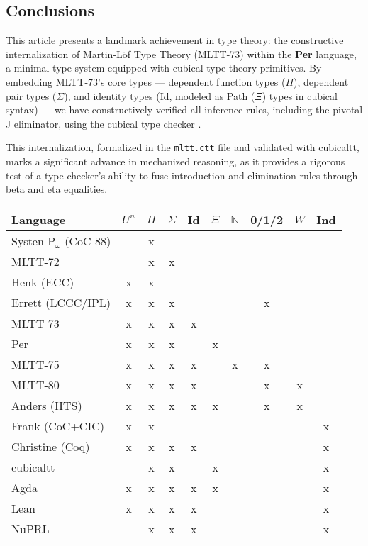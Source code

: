 \documentclass{article}
\begin{document}
\subsection*{Conclusions}

This article presents a landmark achievement in type theory:
the constructive internalization of Martin-Löf Type Theory (MLTT-73)
within the \textbf{Per} language, a minimal type system equipped with
cubical type theory primitives. By embedding MLTT-73’s core types
--- dependent function types ($\Pi$), dependent pair types ($\Sigma$),
and identity types (Id, modeled as Path ($\Xi$) types in cubical syntax) ---
we have constructively verified all inference rules, including the pivotal
J eliminator, using the cubical type checker \cite{Mortberg17}.

This internalization, formalized in the \texttt{mltt.ctt} file and
validated with cubicaltt, marks a significant advance in mechanized
reasoning, as it provides a rigorous test of a type checker’s ability
to fuse introduction and elimination rules through beta and eta equalities.

\begin{table}[!ht]
  \begin{tabular}{lccccccccc}
    \hline
       Language    & $U^n$ & $\Pi$ & $\Sigma$ & Id & $\Xi$ & $\mathbb{N}$ & 0/1/2 & $W$ & Ind  \\
    \hline
Systen P$_\omega$ (CoC-88)  &   & x &   &   &   &   &   &   &   \\
       MLTT-72              &   & x & x &   &   &   &   &   &   \\
       Henk (ECC)           & x & x &   &   &   &   &   &   &   \\
       Errett (LCCC/IPL)    & x & x & x &   &   &   & x &   &   \\
       MLTT-73              & x & x & x & x &   &   &   &   &   \\
       Per                  & x & x & x &   & x &   &   &   &   \\
       MLTT-75              & x & x & x & x &   & x & x &   &   \\
       MLTT-80              & x & x & x & x &   & & x   & x &   \\
       Anders (HTS)         & x & x & x & x & x &   & x & x &   \\
       Frank (CoC+CIC)      & x & x &   &   &   &   &   &   & x \\
       Christine (Coq)      & x & x & x & x &   &   &   &   & x \\
    \hline
       cubicaltt            &   & x & x &   & x &   &   &   & x \\
       Agda                 & x & x & x & x & x &   &   &   & x \\
       Lean                 & x & x & x & x &   &   &   &   & x \\
       NuPRL                &   & x & x & x &   &   &   &   & x \\
    \hline
  \end{tabular}
\end{table}
\end{document}

